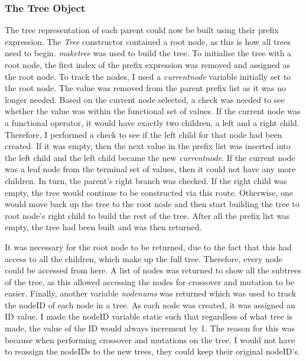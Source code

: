 \documentclass[11pt]{article}
\begin{document}
\subsubsection{The Tree Object}\label{subsubsec:tree}
The tree representation of each parent could now be built using their prefix expression. The \textit{Tree} constructor contained a root node, as this is how all trees need to begin. \textit{make\textunderscore tree} was used to build the tree. To initialise the tree with a root node, the first index of the prefix expression was removed and assigned as the root node. To track the nodes, I used a \textit{current\textunderscore node} variable initially set to the root node.
The value was removed from the parent prefix list as it was no longer needed. Based on the current node selected, a check was needed to see whether the value was within the functional set of values. If the current node was a functional operator,  it would have exactly two children, a left and a right child. Therefore, I performed a check to see if the left child for that node had been created. If it was empty, then the next value in the prefix list was inserted into the left child and the left child became the new \textit{current\textunderscore node}. If the current node was a leaf node from the terminal set of values, then it could not have any more children. In turn, the parent's right branch was checked. If the right child was empty, the tree would continue to be constructed via this route. Otherwise, one would move back up the tree to the root node and then start building the tree to root node's right child to build the rest of the tree. After all the prefix list was empty, the tree had been built and was then returned. 

It was necessary for the root node to be returned, due to the fact that this had access to all the children, which make up the full tree. Therefore, every node could be accessed from here. A list of nodes was returned to show all the subtrees of the tree, as this allowed accessing the nodes for crossover and mutation to be easier. Finally, another variable \textit{nodenums} was returned which was used to track the nodeID of each node in a tree. As each node was created, it was assigned an ID value. I made the nodeID variable static such that regardless of what tree is made, the value of the ID would always increment by 1. The reason for this was because when performing crossover and mutations on the tree, I would not have to reassign the nodeIDs to the new trees, they could keep their original nodeID's.
\end{document}
